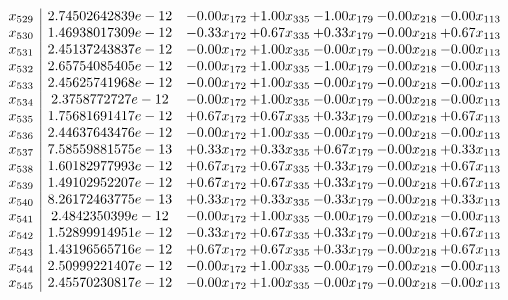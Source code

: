 \documentclass[8pt]{article}
\begin{document}
\[\begin{array}{c| c c@{\hskip 2pt} c@{\hskip 2pt} c@{\hskip 2pt} c@{\hskip 2pt} c@{\hskip 2pt} }
 x_{529}   &  2.74502642839e-12 & -0.00 x_{172} & +  1.00 x_{335} & -1.00 x_{179} & -0.00 x_{218} & -0.00 x_{113}\\
 x_{530}   &  1.46938017309e-12 & -0.33 x_{172} & +  0.67 x_{335} & +  0.33 x_{179} & -0.00 x_{218} & +  0.67 x_{113}\\
 x_{531}   &  2.45137243837e-12 & -0.00 x_{172} & +  1.00 x_{335} & -0.00 x_{179} & -0.00 x_{218} & -0.00 x_{113}\\
 x_{532}   &  2.65754085405e-12 & -0.00 x_{172} & +  1.00 x_{335} & -1.00 x_{179} & -0.00 x_{218} & -0.00 x_{113}\\
 x_{533}   &  2.45625741968e-12 & -0.00 x_{172} & +  1.00 x_{335} & -0.00 x_{179} & -0.00 x_{218} & -0.00 x_{113}\\
 x_{534}   &  2.3758772727e-12 & -0.00 x_{172} & +  1.00 x_{335} & -0.00 x_{179} & -0.00 x_{218} & -0.00 x_{113}\\
 x_{535}   &  1.75681691417e-12 & +  0.67 x_{172} & +  0.67 x_{335} & +  0.33 x_{179} & -0.00 x_{218} & +  0.67 x_{113}\\
 x_{536}   &  2.44637643476e-12 & -0.00 x_{172} & +  1.00 x_{335} & -0.00 x_{179} & -0.00 x_{218} & -0.00 x_{113}\\
 x_{537}   &  7.58559881575e-13 & +  0.33 x_{172} & +  0.33 x_{335} & +  0.67 x_{179} & -0.00 x_{218} & +  0.33 x_{113}\\
 x_{538}   &  1.60182977993e-12 & +  0.67 x_{172} & +  0.67 x_{335} & +  0.33 x_{179} & -0.00 x_{218} & +  0.67 x_{113}\\
 x_{539}   &  1.49102952207e-12 & +  0.67 x_{172} & +  0.67 x_{335} & +  0.33 x_{179} & -0.00 x_{218} & +  0.67 x_{113}\\
 x_{540}   &  8.26172463775e-13 & +  0.33 x_{172} & +  0.33 x_{335} & -0.33 x_{179} & -0.00 x_{218} & +  0.33 x_{113}\\
 x_{541}   &  2.4842350399e-12 & -0.00 x_{172} & +  1.00 x_{335} & -0.00 x_{179} & -0.00 x_{218} & -0.00 x_{113}\\
 x_{542}   &  1.52899914951e-12 & -0.33 x_{172} & +  0.67 x_{335} & +  0.33 x_{179} & -0.00 x_{218} & +  0.67 x_{113}\\
 x_{543}   &  1.43196565716e-12 & +  0.67 x_{172} & +  0.67 x_{335} & +  0.33 x_{179} & -0.00 x_{218} & +  0.67 x_{113}\\
 x_{544}   &  2.50999221407e-12 & -0.00 x_{172} & +  1.00 x_{335} & -0.00 x_{179} & -0.00 x_{218} & -0.00 x_{113}\\
 x_{545}   &  2.45570230817e-12 & -0.00 x_{172} & +  1.00 x_{335} & -0.00 x_{179} & -0.00 x_{218} & -0.00 x_{113}\\

\end{array}\]
\end{document}
